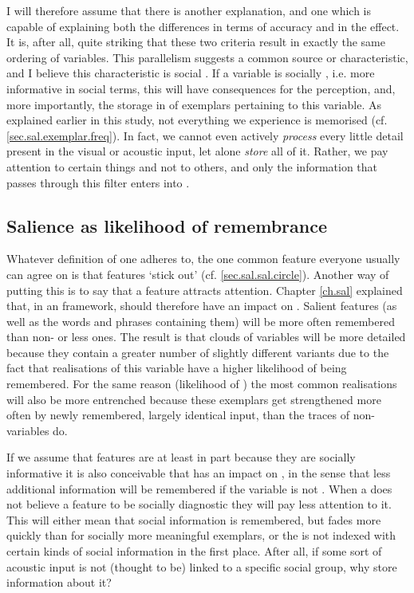 I will therefore assume that there is another explanation, and one which is capable of explaining both the differences in terms of accuracy and in the  effect.
It is, after all, quite striking that these two criteria result in exactly the same ordering of variables.
This parallelism suggests a common source or characteristic, and I believe this characteristic is social .
If a variable is socially , i.e. more informative in social terms, this will have consequences for the perception, and, more importantly, the storage in  of exemplars pertaining to this variable.
As explained earlier in this study, not everything we experience is memorised (cf. \ref{sec.sal.exemplar.freq}).
In fact, we cannot even actively \emph{process} every little detail present in the visual or acoustic input, let alone \emph{store} all of it.
Rather, we pay attention to certain things and not to others, and only the information that passes through this filter enters into .

		\subsection{Salience as likelihood of remembrance}

Whatever definition of  one adheres to, the one common feature everyone usually can agree on is that  features `stick out' (cf. \ref{sec.sal.sal.circle}).
Another way of putting this is to say that a  feature attracts attention.
Chapter \ref{ch.sal} explained that, in an  framework,  should therefore have an impact on .
Salient features (as well as the words and phrases containing them) will be more often remembered than non- or less  ones.
The result is that  clouds of  variables will be more detailed because they contain a greater number of slightly different variants due to the fact that realisations of this variable have a higher likelihood of being remembered.
For the same reason (likelihood of ) the most common realisations will also be more entrenched because these exemplars get strengthened more often by newly remembered, largely identical input, than the traces of non- variables do.

If we assume that features are at least in part  because they are socially informative it is also conceivable that  has an impact on , in the sense that less additional information will be remembered if the variable is not .
When a  does not believe a feature to be socially diagnostic they will pay less attention to it.
This will either mean that social information is remembered, but fades more quickly than for socially more meaningful exemplars, or the  is not indexed with certain kinds of social information in the first place.
After all, if some sort of acoustic input is not (thought to be) linked to a specific social group, why store information about it?

